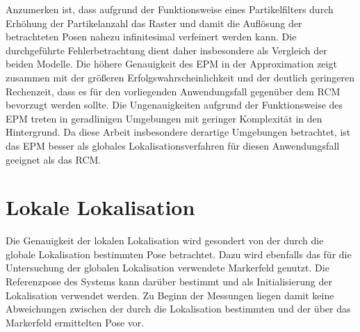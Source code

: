 Anzumerken ist, dass aufgrund der Funktionsweise eines Partikelfilters durch Erhöhung der Partikelanzahl das Raster und damit die Auflösung der betrachteten Posen nahezu infinitesimal verfeinert werden kann. Die durchgeführte Fehlerbetrachtung dient daher insbesondere als Vergleich der beiden Modelle. Die höhere Genauigkeit des EPM in der Approximation zeigt zusammen mit der größeren Erfolgswahrscheinlichkeit und der deutlich geringeren Rechenzeit, dass es für den vorliegenden Anwendungsfall gegenüber dem RCM bevorzugt werden sollte. Die Ungenauigkeiten aufgrund der Funktionsweise des EPM treten in geradlinigen Umgebungen mit geringer Komplexität in den Hintergrund. Da diese Arbeit insbesondere derartige Umgebungen betrachtet, ist das EPM besser als globales Lokalisationsverfahren für diesen Anwendungsfall geeignet als das RCM.

\prever{
}











\section{Lokale Lokalisation}%
Die Genauigkeit der lokalen Lokalisation wird gesondert von der durch die globale Lokalisation bestimmten Pose betrachtet. Dazu wird ebenfalls das für die Untersuchung der globalen Lokalisation verwendete Markerfeld genutzt. Die Referenzpose des Systems kann darüber bestimmt und als Initialisierung der Lokalisation verwendet werden. Zu Beginn der Messungen liegen damit keine Abweichungen zwischen der durch die Lokalisation bestimmten und der über das Markerfeld ermittelten Pose vor.\\

